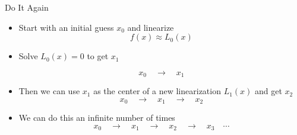 \documentclass[10pt]{beamer}
\begin{document}
\begin{frame}{Do It Again}
\begin{itemize}
   
\item Start with an initial guess $x_0$ and linearize
$$ f(x) \approx L_0(x)$$
\item Solve $L_0(x)=0$ to get $x_1$

\[
x_0
\quad\longrightarrow\quad
x_1
\]

\vfill



\item<2-> Then we can use $x_1$ as the center of a new linearization $L_1(x)$ and get $x_2$
\[
x_0
\quad\longrightarrow\quad
x_1
\quad\longrightarrow\quad
x_2
\]


\vfill

\item<3-> We can do this an infinite number of times
\[
x_0
\quad\longrightarrow\quad
x_1
\quad\longrightarrow\quad
x_2
\quad\longrightarrow\quad x_3 \quad\cdots
\]


\end{itemize}
\end{frame}
\end{document}
